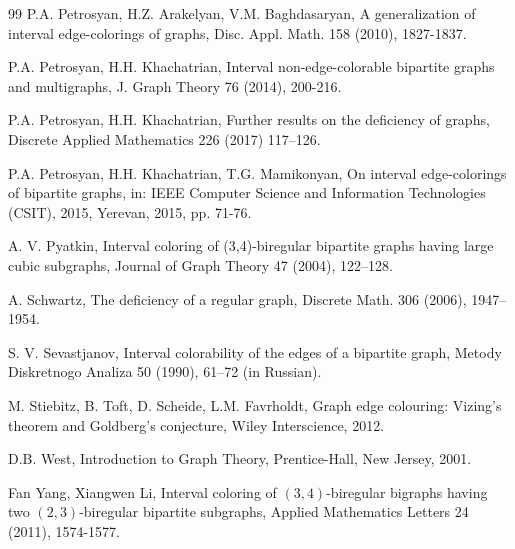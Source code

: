 \documentclass[12pt]{article}
\theoremstyle{plain}
\theoremstyle{definition}
\numberwithin{equation}{section}
\begin{document}
\begin{thebibliography}{99}
 P.A. Petrosyan, H.Z. Arakelyan, V.M. Baghdasaryan, A generalization of interval edge-colorings of graphs, Disc. Appl. Math. 158 (2010), 1827-1837.

 P.A. Petrosyan, H.H. Khachatrian, Interval non-edge-colorable bipartite graphs and multigraphs, J. Graph Theory 76 (2014), 200-216.

P.A. Petrosyan, H.H. Khachatrian, Further results on the deficiency of graphs, Discrete Applied Mathematics 226 (2017) 117--126.

 P.A. Petrosyan, H.H. Khachatrian, T.G. Mamikonyan, On interval edge-colorings of bipartite graphs, in: IEEE Computer Science and Information Technologies (CSIT), 2015, Yerevan, 2015, pp. 71-76.

A. V. Pyatkin, Interval coloring of (3,4)-biregular bipartite graphs having large cubic subgraphs, Journal of Graph Theory 47 (2004), 122--128.

A. Schwartz, The deficiency of a regular graph, Discrete Math. 306 (2006), 1947--1954.

S. V. Sevastjanov, Interval colorability of the edges of a bipartite graph, Metody Diskretnogo Analiza 50 (1990), 61--72 (in Russian).

 M. Stiebitz, B. Toft, D. Scheide, L.M. Favrholdt, Graph edge colouring: Vizing’s theorem and Goldberg’s conjecture, Wiley Interscience, 2012.

 D.B. West, Introduction to Graph Theory, Prentice-Hall, New Jersey, 2001.

Fan Yang, Xiangwen Li, Interval coloring of $(3,4)$-biregular bigraphs having two $(2,3)$-biregular bipartite subgraphs, Applied Mathematics Letters 24 (2011), 1574-1577.
\end{thebibliography}
	
\end{document}
